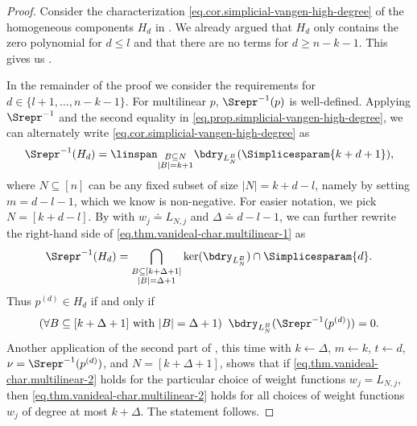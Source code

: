 \begin{proof}
Consider the characterization \eqref{eq.cor.simplicial-vangen-high-degree} of the homogeneous components $H_d$ in . We already argued that $H_d$ only contains the zero polynomial for $d \le l$ and that there are no terms for $d \ge n-k-1$. This gives us .

In the remainder of the proof we consider the requirements for $d \in \{l+1, \dots, n-k-1\}$. For multilinear $p$, $\Srepr^{-1}(p)$ is well-defined. Applying $\Srepr^{-1}$ and the second equality in \eqref{eq.prop.simplicial-vangen-high-degree}, we can alternately write \eqref{eq.cor.simplicial-vangen-high-degree} as
\begin{equation}\label{eq.thm.vanideal-char.multilinear-1}
\Srepr^{-1}(H_d) = \linspan_{\substack{B \subseteq N \\ |B|=k+1}} \bdry_{L_N^B}(\Simplicesparam{k+d+1}),
\end{equation}
where $N \subseteq [n]$ can be any fixed subset of size $|N|=k+d-l$, namely by setting $m=d-l-1$, which we know is non-negative. For easier notation, we pick $N = [k+d-l]$. By  with $w_j \doteq L_{N,j}$ and $\Delta \doteq d-l-1$, we can further rewrite the right-hand side of \eqref{eq.thm.vanideal-char.multilinear-1} as
\[
\Srepr^{-1}(H_d) = \bigcap_{\substack{B \subseteq [k+\Delta+1] \\ |B|=\Delta+1}} \ker(\bdry_{L_N^B}) \cap \Simplicesparam{d}.
\]
Thus $p^{(d)} \in H_d$ if and only if 
\begin{equation}\label{eq.thm.vanideal-char.multilinear-2}
(\forall B \subseteq [k+\Delta+1] \textrm{ with }|B|=\Delta+1) \; \;  
\bdry_{L_N^B}(\Srepr^{-1}(p^{(d)}))=0.
\end{equation}
Another application of the second part of , this time with $k \gets \Delta$, $m \gets k$, $t \gets d$, $\nu=\Srepr^{-1}(p^{(d)})$, and $N=[k+\Delta+1]$, shows that if \eqref{eq.thm.vanideal-char.multilinear-2} holds for the particular choice of weight functions $w_j = L_{N,j}$, then \eqref{eq.thm.vanideal-char.multilinear-2} holds for all choices of weight functions $w_j$ of degree at most $k+\Delta$. The statement follows.
\end{proof}

